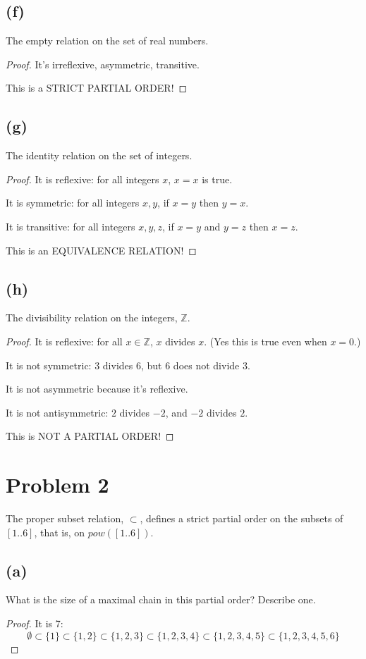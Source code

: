 \documentclass[14pt]{extarticle}
\begin{document}
\subsection{(f)}
The empty relation on the set of real numbers.
\begin{proof}
It's irreflexive, asymmetric, transitive. 

This is a STRICT PARTIAL ORDER!
\end{proof}

\subsection{(g)}
The identity relation on the set of integers.
\begin{proof}
It is reflexive: for all integers $x$, $x=x$ is true.

It is symmetric: for all integers $x, y$, if $x = y$ then $y = x$.

It is transitive: for all integers $x, y, z$, if $x = y$ and $y = z$ then $x = z$.

This is an EQUIVALENCE RELATION!
\end{proof}

\subsection{(h)}
The divisibility relation on the integers, $\mathbb{Z}$.
\begin{proof}
It is reflexive: for all $x \in \mathbb{Z}$, $x$ divides $x$. (Yes this is true even when $x = 0$.)

It is not symmetric: 3 divides 6, but 6 does not divide 3.

It is not asymmetric because it's reflexive.

It is not antisymmetric: $2$ divides $-2$, and $-2$ divides $2$.

This is NOT A PARTIAL ORDER!
\end{proof}

\section{Problem 2}
The proper subset relation, $\subset$, defines a strict partial order on the subsets of $[1..6]$, that is, on $pow([1..6])$.

\subsection{(a)}
What is the size of a maximal chain in this partial order? Describe one.
\begin{proof}
It is 7: 
$$
\emptyset \subset \{1\} \subset \{1, 2\} \subset \{1, 2, 3\} \subset \{1, 2, 3, 4\} \subset \{1, 2, 3, 4, 5\} \subset \{1, 2, 3, 4, 5, 6\}
$$
\end{proof}
\end{document}
